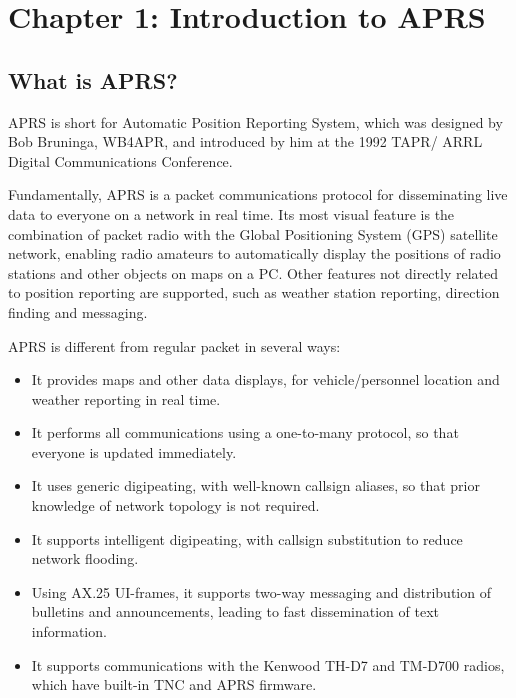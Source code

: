 \chapter {Chapter 1: Introduction to APRS}


\section{What is APRS?}

APRS is short for Automatic Position Reporting System, which was designed
by Bob Bruninga, WB4APR, and introduced by him at the 1992 TAPR/
ARRL Digital Communications Conference.

Fundamentally, APRS is a packet communications protocol for
disseminating live data to everyone on a network in real time. Its most visual
feature is the combination of packet radio with the Global Positioning
System (GPS) satellite network, enabling radio amateurs to automatically
display the positions of radio stations and other objects on maps on a PC.
Other features not directly related to position reporting are supported, such as
weather station reporting, direction finding and messaging.

APRS is different from regular packet in several ways:

\begin{itemize}

\item It provides maps and other data displays, for vehicle/personnel location
and weather reporting in real time.

\item It performs all communications using a one-to-many protocol, so that
everyone is updated immediately.

\item It uses generic digipeating, with well-known callsign aliases, so that prior
knowledge of network topology is not required.

\item It supports intelligent digipeating, with callsign substitution to reduce
network flooding.

\item Using AX.25 UI-frames, it supports two-way messaging and distribution
of bulletins and announcements, leading to fast dissemination of text
information.

\item It supports communications with the Kenwood TH-D7 and TM-D700
radios, which have built-in TNC and APRS firmware.

\end{itemize}

